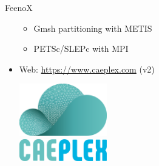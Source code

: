 \documentclass[
  ignorenonframetext,
  aspectratio=169,
]{beamer}
\providecommand{\tightlist}{%
  \setlength{\itemsep}{0pt}\setlength{\parskip}{0pt}}
\begin{document}
\begin{frame}{}
\begin{columns}[T]
\begin{column}{0.5\textwidth}
\begin{exampleblock}{FeenoX}
\begin{itemize}
  \begin{itemize}
  \tightlist
  \item
    Gmsh partitioning with METIS
  \item
    PETSc/SLEPc with MPI
  \end{itemize}
\item
  Web: \url{https://www.caeplex.com} (v2)

  \centering

  \includegraphics[width=0.3\textwidth,height=\textheight]{logo-caeplex-only-cloud.svg}\\
  \includegraphics[width=0.3\textwidth,height=\textheight]{logo-caeplex-only-text.svg}

  \raggedright
\end{itemize}
\end{exampleblock}
\end{column}
\end{columns}
\end{frame}
\end{document}
